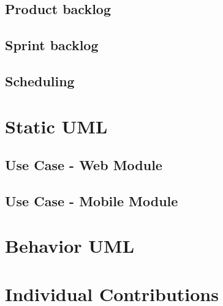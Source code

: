 \documentclass{scrreprt}
\begin{document}
\section{Product backlog}
\section{Sprint backlog}
\section{Scheduling}


\chapter{Static UML}
\section{Use Case - Web Module}
\section{Use Case - Mobile Module}



\chapter{Behavior UML}

    
\chapter{Individual Contributions}
\vspace{2cm}
\end{document}
